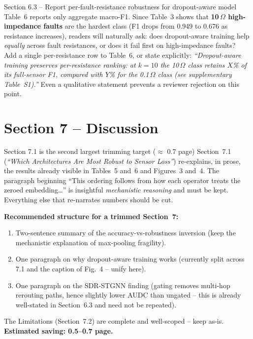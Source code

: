 \documentclass[11pt,a4paper]{article}
\begin{document}
\begin{suggestbox}{Section 6.3 -- Report per-fault-resistance robustness for dropout-aware model}
Table~6 reports only aggregate macro-F1. Since Table~3 shows that
\textbf{10\,$\Omega$ high-impedance faults} are the hardest class (F1 drops
from 0.949 to 0.676 as resistance increases), readers will naturally ask: does
dropout-aware training help \emph{equally} across fault resistances, or does it
fail first on high-impedance faults?\\[4pt]
Add a single per-resistance row to Table~6, or state explicitly:
\textit{``Dropout-aware training preserves per-resistance ranking: at $k{=}10$
the 10\,$\Omega$ class retains $X$\% of its full-sensor F1, compared with
$Y$\% for the 0.1\,$\Omega$ class (see supplementary Table~S1).''} Even a
qualitative statement prevents a reviewer rejection on this point.
\end{suggestbox}

\section{Section 7 -- Discussion}

\begin{trimbox}{Section 7.1 is the second largest trimming target ($\approx$ 0.7 page)}
Section~7.1 (\textit{``Which Architectures Are Most Robust to Sensor Loss''})
re-explains, in prose, the results already visible in Tables~5 and~6 and
Figures~3 and~4. The paragraph beginning ``This ordering follows from how each
operator treats the zeroed embedding\ldots'' is insightful \emph{mechanistic
reasoning} and must be kept. Everything else that re-narrates numbers should be
cut.

\medskip
\textbf{Recommended structure for a trimmed Section~7:}
\begin{enumerate}[leftmargin=*,label=\arabic*.]
  \item Two-sentence summary of the accuracy-vs-robustness inversion (keep
    the mechanistic explanation of max-pooling fragility).
  \item One paragraph on why dropout-aware training works (currently split
    across 7.1 and the caption of Fig.~4 -- unify here).
  \item One paragraph on the SDR-STGNN finding (gating removes multi-hop
    rerouting paths, hence slightly lower AUDC than ungated -- this is
    already well-stated in Section~6.3 and need not be repeated).
\end{enumerate}
The Limitations (Section~7.2) are complete and well-scoped -- keep as-is.
\textbf{Estimated saving: 0.5--0.7 page.}
\end{trimbox}
\end{document}
